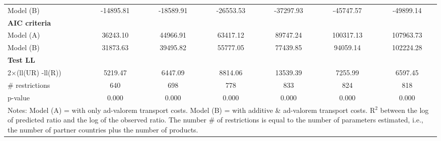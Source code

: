 \documentclass[a4paper,11pt]{article}
\begin{document}
\begin{table}[htbp]
\begin{center}
\begin{tabular}{l|cccccc}
Model (B) & \multicolumn{1}{c}{-14895.81} & \multicolumn{1}{c}{-18589.91} & \multicolumn{1}{c}{-26553.53} & \multicolumn{1}{c}{-37297.93} & \multicolumn{1}{c}{-45747.57} & \multicolumn{1}{c}{-49899.14}  \\
\textbf{AIC criteria} & \multicolumn{1}{c}{} & \multicolumn{1}{c}{} & \multicolumn{1}{c}{} &       & \multicolumn{1}{c}{}  \\
Model (A)& \multicolumn{1}{c}{36243.10} & \multicolumn{1}{c}{44966.91} & \multicolumn{1}{c}{63417.12} & \multicolumn{1}{c}{89747.24} & \multicolumn{1}{c}{100317.13} & \multicolumn{1}{c}{107963.73} \\
Model (B) & \multicolumn{1}{c}{31873.63} & \multicolumn{1}{c}{39495.82} & \multicolumn{1}{c}{55777.05} & \multicolumn{1}{c}{77439.85} & \multicolumn{1}{c}{94059.14} & \multicolumn{1}{c}{102224.28}  \\
\textbf{Test LL} &       &       &       &       &       &       \\
2$\times$(ll(UR) -ll(R)) & \multicolumn{1}{c}{5219.47} & \multicolumn{1}{c}{6447.09} & \multicolumn{1}{c}{8814.06} & \multicolumn{1}{c}{13539.39} & \multicolumn{1}{c}{7255.99} & \multicolumn{1}{c}{6597.45}  \\
\# restrictions  & \multicolumn{1}{c}{640} & \multicolumn{1}{c}{698} & \multicolumn{1}{c}{778} & \multicolumn{1}{c}{833} & \multicolumn{1}{c}{824} & \multicolumn{1}{c}{818}  \\
p-value & \multicolumn{1}{c}{0.000} & \multicolumn{1}{c}{0.000} & \multicolumn{1}{c}{0.000} & \multicolumn{1}{c}{0.000} & \multicolumn{1}{c}{0.000} & \multicolumn{1}{c}{0.000} \\
\hline\hline
\multicolumn{7}{l}{\parbox[l]{15cm}{ \vspace{7pt}\scriptsize{Notes: Model (A) = with only ad-valorem transport costs. Model (B) = with additive \& ad-valorem
transport costs. R$^{2}$ between the log of predicted ratio and the log of the observed ratio. The number \# of restrictions is equal to the number of parameters estimated, i.e., the number of partner countries plus the number of products.}}}
\end{tabular}%
\end{center}
\end{table}%
\end{document}

